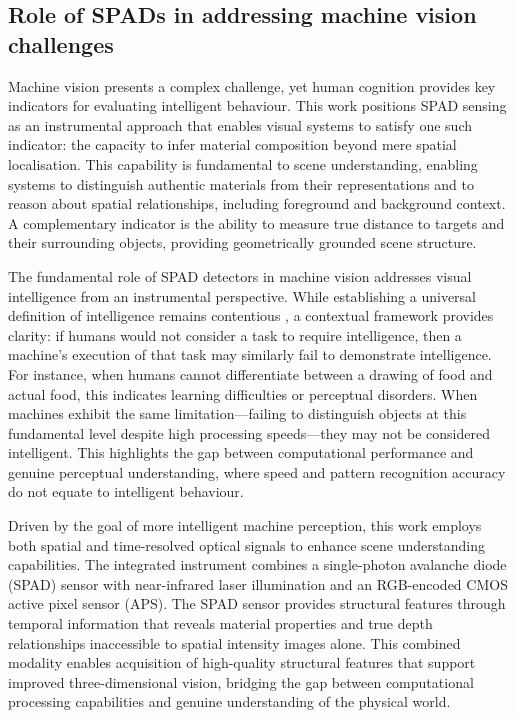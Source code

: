 \documentclass[12pt,a4paper,oneside]{report}
\begin{document}
\subsection{Role of SPADs in addressing machine vision challenges}
\label{subsec:spads_machine_vision}

Machine vision presents a complex challenge, yet human cognition provides key indicators for evaluating intelligent behaviour. This work positions SPAD sensing as an instrumental approach that enables visual systems to satisfy one such indicator: the capacity to infer material composition beyond mere spatial localisation. This capability is fundamental to scene understanding, enabling systems to distinguish authentic materials from their representations and to reason about spatial relationships, including foreground and background context. A complementary indicator is the ability to measure true distance to targets and their surrounding objects, providing geometrically grounded scene structure.

The fundamental role of SPAD detectors in machine vision addresses visual intelligence from an instrumental perspective. While establishing a universal definition of intelligence remains contentious \cite{minsky1986,chollet2019}, a contextual framework provides clarity: if humans would not consider a task to require intelligence, then a machine's execution of that task may similarly fail to demonstrate intelligence. For instance, when humans cannot differentiate between a drawing of food and actual food, this indicates learning difficulties or perceptual disorders. When machines exhibit the same limitation—failing to distinguish objects at this fundamental level despite high processing speeds—they may not be considered intelligent. This highlights the gap between computational performance and genuine perceptual understanding, where speed and pattern recognition accuracy do not equate to intelligent behaviour.

Driven by the goal of more intelligent machine perception, this work employs both spatial and time-resolved optical signals to enhance scene understanding capabilities. The integrated instrument combines a single-photon avalanche diode (SPAD) sensor with near-infrared laser illumination and an RGB-encoded CMOS active pixel sensor (APS). The SPAD sensor provides structural features through temporal information that reveals material properties and true depth relationships inaccessible to spatial intensity images alone. This combined modality enables acquisition of high-quality structural features that support improved three-dimensional vision, bridging the gap between computational processing capabilities and genuine understanding of the physical world.
\end{document}
